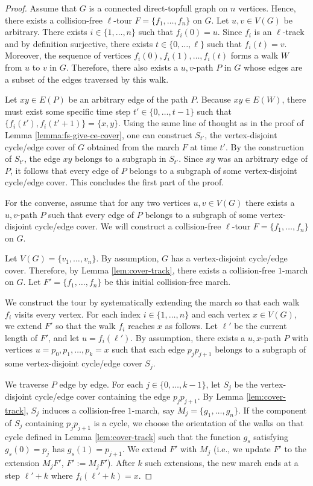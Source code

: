 \documentclass{article}
\begin{document}
\begin{proof} 
Assume that $G$ is a connected direct-topfull graph on $n$ vertices. Hence, there exists a collision-free $\ell$-tour $F=\{f_1, \ldots, f_n\}$ on $G$. Let $u,v\in V(G)$ be arbitrary. There exists $i\in \{1,\ldots, n\}$ such that $f_i(0)=u$. Since $f_i$ is an $\ell$-track and by definition surjective, there exists $t\in \{0, \ldots, \ell\}$ such that $f_i(t)=v$. Moreover, the sequence of vertices $f_i(0),f_i(1),\ldots,f_i(t)$ forms a walk $W$ from $u$ to $v$ in $G$. Therefore, there also exists a $u,v$-path $P$ in $G$ whose edges are a subset of the edges traversed by this walk.

Let $xy \in E(P)$ be an arbitrary edge of the path $P$. Because $xy\in E(W)$, there must exist some specific time step $t' \in \{0, \ldots, t-1\}$ such that $\{f_i(t'), f_i(t'+1)\} = \{x, y\}$. Using the same line of thought as in the proof of Lemma \ref{lemma:fs-give-ce-cover}, one can construct $S_{t'}$, the vertex-disjoint cycle/edge cover of $G$ obtained from the march $F$ at time $t'$. 
By the construction of $S_{t'}$, the edge $xy$ belongs to a subgraph in $S_{t'}$.
Since $xy$ was an arbitrary edge of $P$, it follows that every edge of $P$ belongs to a subgraph of some vertex-disjoint cycle/edge cover. This concludes the first part of the proof.

For the converse, assume that for any two vertices $u,v \in V(G)$ there exists a $u,v$-path $P$ such that every edge of $P$ belongs to a subgraph of some vertex-disjoint cycle/edge cover. We will construct a collision-free $\ell$-tour $F=\{f_1, \ldots,f_n\}$ on $G$.

Let $V(G) = \{v_1, \ldots, v_n\}$. By assumption, $G$ has a vertex-disjoint cycle/edge cover. Therefore, by Lemma \ref{lem:cover-track}, there exists a collision-free $1$-march on $G$. Let $F' = \{f_1, \ldots, f_n\}$ be this initial collision-free march. 

We construct the tour by systematically extending the march so that each walk $f_i$ visits every vertex. For each index $i \in \{1, \ldots, n\}$ and each vertex $x \in V(G)$, we extend $F'$ so that the walk $f_i$ reaches $x$ as follows. Let $\ell'$ be the current length of $F'$, and let $u = f_i(\ell')$. By assumption, there exists a $u,x$-path $P$ with vertices $u = p_0, p_1, \ldots, p_k = x$ such that each edge $p_j p_{j+1}$ belongs to a subgraph of some vertex-disjoint cycle/edge cover $S_j$.

We traverse $P$ edge by edge. For each $j \in \{0, \ldots, k-1\}$, let $S_j$ be the vertex-disjoint cycle/edge cover containing the edge $p_j p_{j+1}$. By Lemma \ref{lem:cover-track}, $S_j$ induces a collision-free $1$-march, say $M_j = \{g_1, \ldots, g_n\}$. If the component of $S_j$ containing $p_j p_{j+1}$ is a cycle, we choose the orientation of the walks on that cycle defined in Lemma \ref{lem:cover-track} such that the function $g_s$ satisfying $g_s(0) = p_j$ has $g_s(1) = p_{j+1}$. We extend $F'$ with $M_j$ (i.e., we update $F'$ to the extension $M_j F'$, $F':=M_j F'$). After $k$ such extensions, the new march ends at a step $\ell'+k$ where $f_i(\ell'+k) = x$. 


\end{proof}
\end{document}
